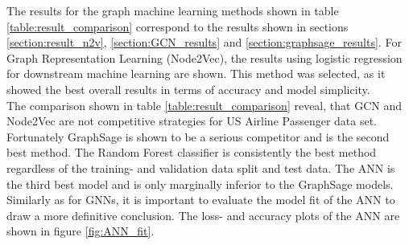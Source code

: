   \begin{table}[h]
    \centering
    \caption{Result Comparison}
    \label{table:result_comparison}
  \end{table}

  \noindent The results for the graph machine learning methods shown in table 
  \ref{table:result_comparison} correspond to the results shown in sections
  \ref{section:result_n2v}, \ref{section:GCN_results} and 
  \ref{section:graphsage_results}. For Graph Representation Learning
  (Node2Vec), the results using logistic regression for downstream machine
  learning are shown. This method was selected, as it showed the best overall 
  results in terms of accuracy and model simplicity. \\

  \noindent The comparison shown in table \ref{table:result_comparison} reveal,
  that GCN and Node2Vec are not competitive strategies for US Airline Passenger
  data set. Fortunately GraphSage is shown to be a serious competitor and is the
  second best method. The Random Forest classifier is consistently the best 
  method regardless of the training- and validation data split and test data. 
  The ANN is the third best model and is only marginally inferior to the
  GraphSage models. Similarly as for GNNs, it is important to evaluate the 
  model fit of the ANN to draw a more definitive conclusion. The loss- and
  accuracy plots of the ANN are shown in figure \ref{fig:ANN_fit}.

